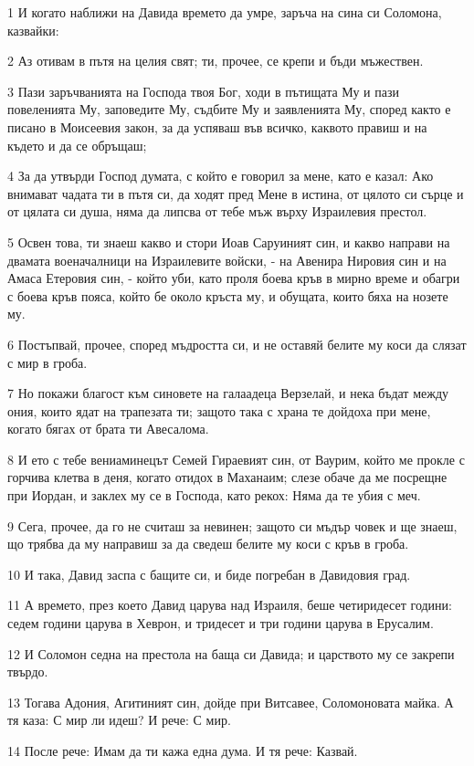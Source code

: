 \par 1 И когато наближи на Давида времето да умре, заръча на сина си Соломона, казвайки:
\par 2 Аз отивам в пътя на целия свят; ти, прочее, се крепи и бъди мъжествен.
\par 3 Пази заръчванията на Господа твоя Бог, ходи в пътищата Му и пази повеленията Му, заповедите Му, съдбите Му и заявленията Му, според както е писано в Моисеевия закон, за да успяваш във всичко, каквото правиш и на където и да се обръщаш;
\par 4 За да утвърди Господ думата, с който е говорил за мене, като е казал: Ако внимават чадата ти в пътя си, да ходят пред Мене в истина, от цялото си сърце и от цялата си душа, няма да липсва от тебе мъж върху Израилевия престол.
\par 5 Освен това, ти знаеш какво и стори Иоав Саруиният син, и какво направи на двамата военачалници на Израилевите войски, - на Авенира Нировия син и на Амаса Етеровия син, - който уби, като проля боева кръв в мирно време и обагри с боева кръв пояса, който бе около кръста му, и обущата, които бяха на нозете му.
\par 6 Постъпвай, прочее, според мъдростта си, и не оставяй белите му коси да слязат с мир в гроба.
\par 7 Но покажи благост към синовете на галаадеца Верзелай, и нека бъдат между ония, които ядат на трапезата ти; защото така с храна те дойдоха при мене, когато бягах от брата ти Авесалома.
\par 8 И ето с тебе вениаминецът Семей Гираевият син, от Ваурим, който ме прокле с горчива клетва в деня, когато отидох в Маханаим; слезе обаче да ме посрещне при Иордан, и заклех му се в Господа, като рекох: Няма да те убия с меч.
\par 9 Сега, прочее, да го не считаш за невинен; защото си мъдър човек и ще знаеш, що трябва да му направиш за да сведеш белите му коси с кръв в гроба.
\par 10 И така, Давид заспа с бащите си, и биде погребан в Давидовия град.
\par 11 А времето, през което Давид царува над Израиля, беше четиридесет години: седем години царува в Хеврон, и тридесет и три години царува в Ерусалим.
\par 12 И Соломон седна на престола на баща си Давида; и царството му се закрепи твърдо.
\par 13 Тогава Адония, Агитиният син, дойде при Витсавее, Соломоновата майка. А тя каза: С мир ли идеш? И рече: С мир.
\par 14 После рече: Имам да ти кажа една дума. И тя рече: Казвай.
